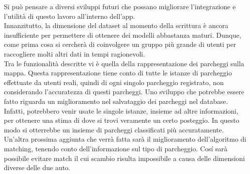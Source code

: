 Si può pensare a diversi sviluppi futuri che possano migliorare l'integrazione
e l'utilità di questo lavoro all'interno dell'app.\\
Innanzitutto, la dimensione del dataset al momento della scrittura è ancora
insufficiente per permettere di ottenere dei modelli abbastanza maturi. Dunque,
come prima cosa si cercherà di coinvolgere un gruppo più grande di utenti
per raccogliere molti altri dati in tempi ragionevoli.\\
Tra le funzionalità descritte vi è quella della rappresentazione dei parcheggi 
sulla mappa. Questa rappresentazione tiene conto di tutte le istanze di parcheggio
effettuate da utenti reali, quindi di ogni singolo parcheggio registrato, non 
considerando l'accuratezza di questi parcheggi. Uno sviluppo che potrebbe essere
fatto riguarda un miglioramento nel salvataggio dei parcheggi nel database. Infatti,
potrebbero venir usate le singole istanze, insieme ad altre informazioni, per
ottenere una stima di dove si trovi veramente un certo posteggio. In questo modo
si otterrebbe un insieme di parcheggi classificati più accuratamente.\\
Un'altra prossima aggiunta che verrà fatta sarà il miglioramento dell'algoritmo
di matching, tenendo conto dell'informazione sul tipo di parcheggio. Cosí sarà 
possibile evitare match il cui scambio risulta impossibile a causa delle dimensioni
diverse delle due auto.